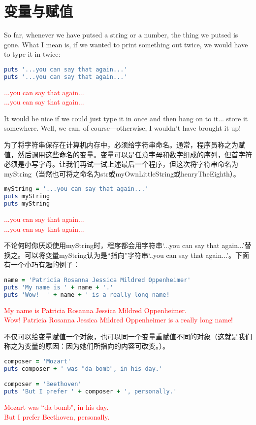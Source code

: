 \chapter{变量与赋值}

So far, whenever we have putsed a string or a number, the thing we putsed is gone. What I mean is, if we wanted to print something out twice, we would have to type it in twice: \\

\begin{lstlisting}[language=ruby]
puts '...you can say that again...'
puts '...you can say that again...'
\end{lstlisting}
\textcolor{red}{
...you can say that again...\\
...you can say that again...
}

It would be nice if we could just type it in once and then hang on to it... store it somewhere. Well, we can, of course—otherwise, I wouldn't have brought it up! 

为了将字符串保存在计算机内存中，必须给字符串命名。通常，程序员称之为赋值，然后调用这些命名的变量。变量可以是任意字母和数字组成的序列，但首字符必须是小写字母。让我们再试一试上述最后一个程序，但这次将字符串命名为myString（当然也可将之命名为str或myOwnLittleString或henryTheEighth）。\\
\begin{lstlisting}[language=ruby]
myString = '...you can say that again...'
puts myString
puts myString
\end{lstlisting}
\textcolor{red}{
...you can say that again...\\
...you can say that again...
}

不论何时你厌烦使用myString时，程序都会用字符串`...you can say that again...'替换之。可以将变量myString认为是“指向”字符串`..you can say that again...'。下面有一个小巧有趣的例子：

\begin{lstlisting}[language=ruby]
name = 'Patricia Rosanna Jessica Mildred Oppenheimer'
puts 'My name is ' + name + '.'
puts 'Wow!  ' + name + ' is a really long name!
\end{lstlisting}
\textcolor{red}{
My name is Patricia Rosanna Jessica Mildred Oppenheimer.\\
Wow!  Patricia Rosanna Jessica Mildred Oppenheimer is a really long name!
}

不仅可以给变量赋值一个对象，也可以同一个变量重赋值不同的对象（这就是我们称之为变量的原因：因为她们所指向的内容可改变。）。
\begin{lstlisting}[language=ruby]
composer = 'Mozart'
puts composer + ' was "da bomb", in his day.'

composer = 'Beethoven'
puts 'But I prefer ' + composer + ', personally.'
\end{lstlisting}
\textcolor{red}{
Mozart was ``da bomb", in his day.\\
But I prefer Beethoven, personally.
}

